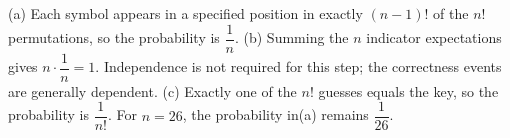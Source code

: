 (a) Each symbol appears in a specified position in exactly $(n-1)!$ of the $n!$ permutations, so the probability is $\boxed{\dfrac{1}{n}}$. (b) Summing the $n$ indicator expectations gives $n\cdot\dfrac{1}{n}=\boxed1$. Independence is not required for this step; the correctness events are generally dependent. (c) Exactly one of the $n!$ guesses equals the key, so the probability is $\boxed{\dfrac{1}{n!}}$. For $n=26$, the probability in(a) remains $\dfrac{1}{26}$.
